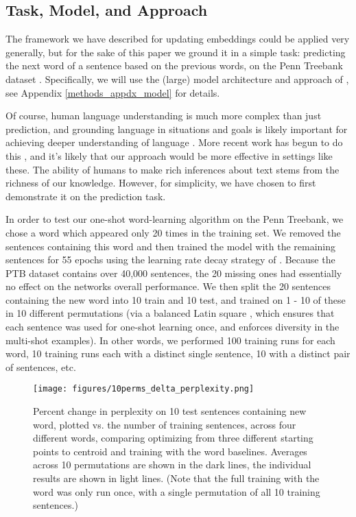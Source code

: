 \documentclass{article}
\begin{document}
\subsection{Task, Model, and Approach}
The framework we have described for updating embeddings could be applied very generally, but for the sake of this paper we ground it in a simple task: predicting the next word of a sentence based on the previous words, on the Penn Treebank dataset \citep{Marcus1993}. Specifically, we will use the (large) model architecture and approach of \citet{Zaremba2014a}, see Appendix \ref{methods_appdx_model} for details. \par
Of course, human language understanding is much more complex than just prediction, and grounding language in situations and goals is likely important for achieving deeper understanding of language \citep{Gauthier2016}. More recent work has begun to do this \citep[e.g]{Hermann2017}, and it's likely that our approach would be more effective in settings like these. The ability of humans to make rich inferences about text stems from the richness of our knowledge. However, for simplicity, we have chosen to first demonstrate it on the prediction task. \par 
In order to test our one-shot word-learning algorithm on the Penn Treebank, we chose a word which appeared only 20 times in the training set. We removed the sentences containing this word and then trained the model with the remaining sentences for 55 epochs using the learning rate decay strategy of \citet{Zaremba2014a}. Because the PTB dataset contains over 40,000 sentences, the 20 missing ones had essentially no effect on the networks overall performance. We then split the 20 sentences containing the new word into 10 train and 10 test, and trained on 1 - 10 of these in 10 different permutations (via a balanced Latin square \citep{Campbell1980}, which ensures that each sentence was used for one-shot learning once, and enforces diversity in the multi-shot examples). In other words, we performed 100 training runs for each word, 10 training runs each with a distinct single sentence, 10 with a distinct pair of sentences, etc.
\begin{figure}[t]
\centering
\texttt{[image: figures/10perms\_delta\_perplexity.png]}
\caption{Percent change in perplexity on 10 test sentences containing new word, plotted vs. the number of training sentences, across four different words, comparing optimizing from three different starting points to centroid and training with the word baselines. Averages across 10 permutations are shown in the dark lines, the individual results are shown in light lines. (Note that the full training with the word was only run once, with a single permutation of all 10 training sentences.)}
\label{main_results_1}
\end{figure}
\end{document}
